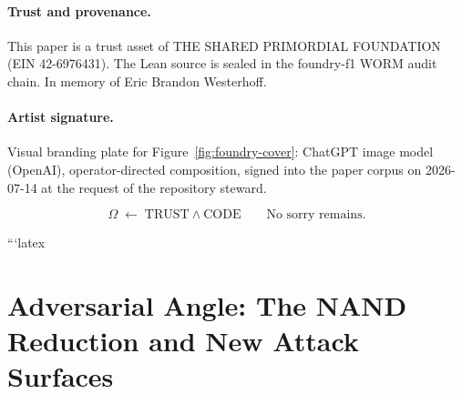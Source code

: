 \documentclass[11pt]{article}
\theoremstyle{definition}
\begin{document}
\paragraph{Trust and provenance.}
This paper is a trust asset of THE SHARED PRIMORDIAL FOUNDATION
(EIN 42-6976431).
The Lean source is sealed in the foundry-f1 WORM audit chain.
In memory of Eric Brandon Westerhoff.

\paragraph{Artist signature.}
Visual branding plate for Figure~\ref{fig:foundry-cover}:
ChatGPT image model (OpenAI), operator-directed composition, signed into the
paper corpus on 2026-07-14 at the request of the repository steward.

\[
\Omega \;\leftarrow\; \mathrm{TRUST} \wedge \mathrm{CODE}
\qquad \text{No sorry remains.}
\]

































```latex












\section{Adversarial Angle: The NAND Reduction and New Attack Surfaces}
\end{document}
